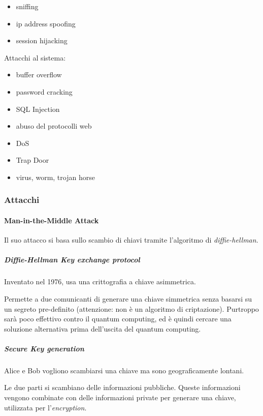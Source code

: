 \begin{itemize}
\item sniffing
\item ip address spoofing
\item session hijacking
\end{itemize}

Attacchi al sistema:

\begin{itemize}
\item buffer overflow
\item password cracking
\item SQL Injection
\item abuso del protocolli web
\item DoS
\item Trap Door
\item virus, worm, trojan horse
\end{itemize}

\subsubsection{Attacchi}

\paragraph{Man-in-the-Middle Attack}

Il suo attacco si basa sullo scambio di chiavi tramite l'algoritmo di 
\textit{diffie-hellman}.

\subparagraph{Diffie-Hellman Key exchange protocol}

Inventato nel 1976, usa una crittografia a chiave asimmetrica.

Permette a due comunicanti di generare una chiave simmetrica senza basarsi su 
un segreto pre-definito (attenzione: non è un algoritmo di criptazione). 
Purtroppo sarà poco effettivo contro il quantum computing, ed è quindi cercare 
una soluzione alternativa prima dell'uscita del quantum computing.


\subparagraph{Secure Key generation}

Alice e Bob vogliono scambiarsi una chiave ma sono geograficamente lontani.

Le due parti si scambiano delle informazioni pubbliche. Queste informazioni 
vengono combinate con delle informazioni private per generare una chiave, 
utilizzata per l'\textit{encryption}.


